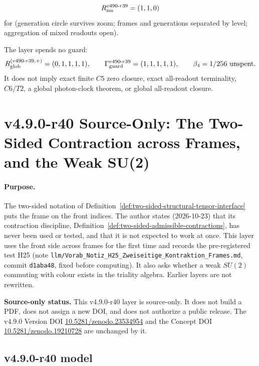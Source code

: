 \[
R_{\rm zm}^{v490\text{-}r39}=(1,1,0)
\]
for (generation circle survives zoom; frames and generations separated by level; aggregation of mixed readouts open).

The layer spends no guard:
\[
R_{\rm glob}^{(v490\text{-}r39,+)}=(0,1,1,1,1),
\qquad
\Gamma_{\rm guard}^{v490\text{-}r39}=(1,1,1,1,1),
\qquad
\beta_4=1/256\ \text{unspent}.
\]
It does not imply exact finite \(C5\) zero closure, exact all-readout terminality,
\(C6/T2\), a global photon-clock theorem, or global all-readout closure.
\clearpage
\section*{v4.9.0-r40 Source-Only: The Two-Sided Contraction across Frames, and the Weak SU(2)}
\label{sec:v490-r40-two-sided-frames}

\paragraph{Purpose.}
The two-sided notation of Definition~\ref{def:two-sided-structural-tensor-interface} puts the frame on the front indices.  The author
states (2026-10-23) that its contraction discipline, Definition~\ref{def:two-sided-admissible-contractions}, has never been used or
tested, and that it is not expected to work at once.  This layer uses the front side across frames for the first time and records
the pre-registered test H25 (note \texttt{llm/Vorab\_Notiz\_H25\_Zweiseitige\_Kontraktion\_Frames.md}, commit \texttt{d1aba48}, fixed
before computing).  It also asks whether a weak \(SU(2)\) commuting with colour exists in the triality algebra.  Earlier layers are not
rewritten.

\noindent\textbf{Source-only status.}
This v4.9.0-r40 layer is source-only.  It does not build a PDF, does not assign a new DOI,
and does not authorize a public release.  The v4.9.0 Version DOI
\href{https://doi.org/10.5281/zenodo.23534954}{10.5281/zenodo.23534954} and the Concept DOI
\href{https://doi.org/10.5281/zenodo.19210728}{10.5281/zenodo.19210728} are unchanged by it.

\subsection*{v4.9.0-r40 model}
\label{subsec:v490-r40-model}

